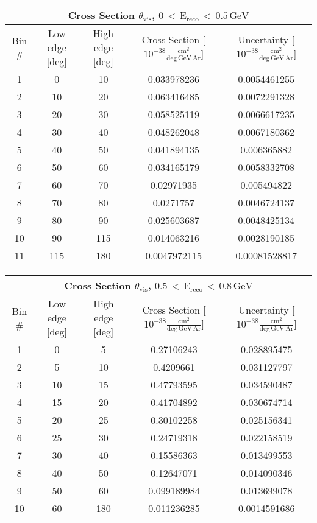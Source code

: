 \begin{table}[H]
\raggedright
\begin{adjustbox}{width=\textwidth}
\small
\begin{tabular}{ |c|c|c|c|c| }
\hline
\multicolumn{5}{|c|}{Cross Section $\theta_{\mathrm{vis}}$, $\mathrm{0\,<\,E_{reco}\,<\,0.5\,GeV}$} \\
\hline
\hline
Bin \# & Low edge [deg] & High edge [deg] & Cross Section [$10^{-38}\mathrm{\frac{cm^{2}}{deg\,GeV\,Ar}}$] & Uncertainty [$10^{-38}\mathrm{\frac{cm^{2}}{deg\,GeV\,Ar}}$] \\
\hline
\hline
1 & 0 & 10 & 0.033978236 & 0.0054461255\\
2 & 10 & 20 & 0.063416485 & 0.0072291328\\
3 & 20 & 30 & 0.058525119 & 0.0066617235\\
4 & 30 & 40 & 0.048262048 & 0.0067180362\\
5 & 40 & 50 & 0.041894135 & 0.006365882\\
6 & 50 & 60 & 0.034165179 & 0.0058332708\\
7 & 60 & 70 & 0.02971935 & 0.005494822\\
8 & 70 & 80 & 0.0271757 & 0.0046724137\\
9 & 80 & 90 & 0.025603687 & 0.0048425134\\
10 & 90 & 115 & 0.014063216 & 0.0028190185\\
11 & 115 & 180 & 0.0047972115 & 0.00081528817\\
\hline
\end{tabular}
\end{adjustbox}
\end{table}


\begin{table}[H]
\raggedright
\begin{adjustbox}{width=\textwidth}
\small
\begin{tabular}{ |c|c|c|c|c| }
\hline
\multicolumn{5}{|c|}{Cross Section $\theta_{\mathrm{vis}}$, $\mathrm{0.5\,<\,E_{reco}\,<\,0.8\,GeV}$} \\
\hline
\hline
Bin \# & Low edge [deg] & High edge [deg] & Cross Section [$10^{-38}\mathrm{\frac{cm^{2}}{deg\,GeV\,Ar}}$] & Uncertainty [$10^{-38}\mathrm{\frac{cm^{2}}{deg\,GeV\,Ar}}$] \\
\hline
\hline
1 & 0 & 5 & 0.27106243 & 0.028895475\\
2 & 5 & 10 & 0.4209661 & 0.031127797\\
3 & 10 & 15 & 0.47793595 & 0.034590487\\
4 & 15 & 20 & 0.41704892 & 0.030674714\\
5 & 20 & 25 & 0.30102258 & 0.025156341\\
6 & 25 & 30 & 0.24719318 & 0.022158519\\
7 & 30 & 40 & 0.15586363 & 0.013499553\\
8 & 40 & 50 & 0.12647071 & 0.014090346\\
9 & 50 & 60 & 0.099189984 & 0.013699078\\
10 & 60 & 180 & 0.011236285 & 0.0014591686\\
\hline
\end{tabular}
\end{adjustbox}
\end{table}



